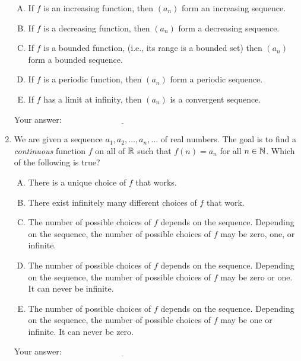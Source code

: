 \documentclass[10pt]{amsart}
\begin{document}
\begin{enumerate}
  \begin{enumerate}[(A)]
  \item If $f$ is an increasing function, then $(a_n)$ form an
    increasing sequence.
  \item If $f$ is a decreasing function, then $(a_n)$ form a
    decreasing sequence.
  \item If $f$ is a bounded function, (i.e., its range is a bounded
    set) then $(a_n)$ form a bounded sequence.
  \item If $f$ is a periodic function, then $(a_n)$ form a periodic sequence.
  \item If $f$ has a limit at infinity, then $(a_n)$ is a convergent
    sequence.
  \end{enumerate}

  \vspace{0.1in}
  Your answer: $\underline{\qquad\qquad\qquad\qquad\qquad\qquad\qquad}$
  \vspace{0.15in}

\item We are given a sequence $a_1, a_2, \dots, a_n, \dots$ of real
  numbers. The goal is to find a {\em continuous} function $f$ on all
  of $\mathbb{R}$ such that $f(n) = a_n$ for all $n \in \mathbb{N}$. Which of the
  following is true?

  \begin{enumerate}[(A)]
  \item There is a unique choice of $f$ that works.
  \item There exist infinitely many different choices of $f$ that work.
  \item The number of possible choices of $f$ depends on the
    sequence. Depending on the sequence, the number of possible
    choices of $f$ may be zero, one, or infinite.
  \item The number of possible choices of $f$ depends on the
    sequence. Depending on the sequence, the number of possible
    choices of $f$ may be zero or one. It can never be infinite.
  \item The number of possible choices of $f$ depends on the
    sequence. Depending on the sequence, the number of possible
    choices of $f$ may be one or infinite. It can never be zero.
  \end{enumerate}

  \vspace{0.1in}
  Your answer: $\underline{\qquad\qquad\qquad\qquad\qquad\qquad\qquad}$
  \vspace{0.15in}


\end{enumerate}
\end{document}
